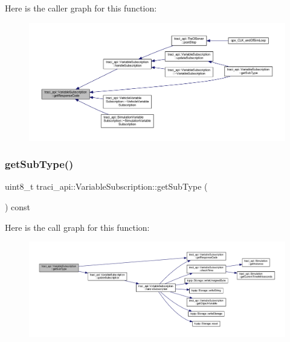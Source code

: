 Here is the caller graph for this function\+:\nopagebreak
\begin{figure}[H]
\begin{center}
\leavevmode
\includegraphics[width=350pt]{classtraci__api_1_1_variable_subscription_a3e852072c435d02f96ff91f81506cef9_icgraph}
\end{center}
\end{figure}
\mbox{\label{classtraci__api_1_1_variable_subscription_a598f7414334878f7943bfadbbf6a42d4}} 
\subsubsection{\texorpdfstring{get\+Sub\+Type()}{getSubType()}}
{\footnotesize\ttfamily uint8\+\_\+t traci\+\_\+api\+::\+Variable\+Subscription\+::get\+Sub\+Type (\begin{DoxyParamCaption}{ }\end{DoxyParamCaption}) const\hspace{0.3cm}{\ttfamily [inline]}}

Here is the call graph for this function\+:\nopagebreak
\begin{figure}[H]
\begin{center}
\leavevmode
\includegraphics[width=350pt]{classtraci__api_1_1_variable_subscription_a598f7414334878f7943bfadbbf6a42d4_cgraph}
\end{center}
\end{figure}
\mbox{\label{classtraci__api_1_1_variable_subscription_ab75320e8ec7d1406ea47a703fb09de63}} 
